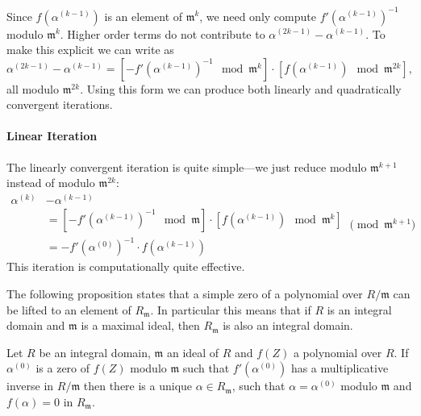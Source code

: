 Since $f(\alpha^{(k-1)})$ is an element of $\mathfrak{m}^k$, we need
only compute $f'(\alpha^{(k-1)})^{-1}$ modulo $\mathfrak{m}^k$.
Higher order terms do not contribute to $\alpha^{(2k-1)} -
\alpha^{(k-1)}$.  To make this explicit we can write
 as
\begin{equation}\label{Explicit:UNewton:Eq}
\alpha^{(2k-1)} - \alpha^{(k-1)} = 
\left[ - f'(\alpha^{(k-1)})^{-1} \mod{\mathfrak{m}^k}\right]
\cdot
\left[f(\alpha^{(k-1)}) \mod{\mathfrak{m}^{2k}}\right],
\end{equation}
all modulo $\mathfrak{m}^{2k}$.  Using this form we can produce both
linearly and quadratically convergent iterations.

\paragraph{Linear Iteration}

The linearly convergent iteration is quite simple---we just reduce
 modulo $\mathfrak{m}^{k+1}$ instead of
modulo $\mathfrak{m}^{2k}$:
\begin{equation}
\label{Modified:UNewton:Eq}
  \begin {aligned}
  \alpha^{(k)} &- \alpha^{(k-1)} \\
     &=
    \left[ - f'(\alpha^{(k-1)})^{-1} \mod{\mathfrak{m}}\right]
    \cdot
    \left[f(\alpha^{(k-1)}) \mod{\mathfrak{m}^k}\right]\\
    & = - f'(\alpha^{(0)})^{-1} \cdot f(\alpha^{(k-1)})
  \end{aligned}
  \pmod{\mathfrak{m}^{k+1}}
\end{equation}
This iteration is computationally quite effective.

The following proposition states that a simple zero of a polynomial
over $R/\mathfrak{m}$ can be lifted to an element of $R_\mathfrak{m}$.
In particular this means that if $R$ is an integral domain and
$\mathfrak{m}$ is a maximal ideal, then $R_\mathfrak{m}$ is also an
integral domain.

\begin{proposition} \label{UNewton:Iter:Prop}
Let $R$ be an integral domain, $\mathfrak{m}$ an ideal of $R$ and $f(Z)$
a polynomial over $R$.  If $\alpha^{(0)}$ is a zero of $f(Z)$ modulo
$\mathfrak{m}$ such that $f'(\alpha^{(0)})$ has a multiplicative inverse
in $R/\mathfrak{m}$ then there is a unique $\alpha \in R_{\mathfrak{m}}$,
such that $\alpha = \alpha^{(0)}$ modulo $\mathfrak{m}$ and $f(\alpha) =
0$ in $R_{\mathfrak{m}}$.
\end{proposition}

